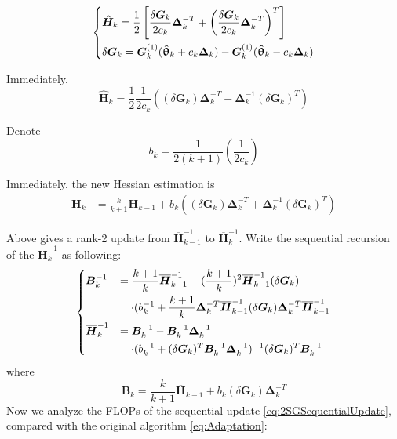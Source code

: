 \documentclass[conference]{IEEEtran}
\newcommand{\bG}{\bm{G}}
\newcommand{\bDelta}{\bm{\Delta}}
\newcommand{\oH}{\bm{\overline{H}}}
\newcommand{\hH}{\bm{\hat{H}}}
\newcommand{\htheta}{\bm{\hat{\uptheta}}}
\begin{document}
\begin{equation} \label{eq:notationSG}
\begin{dcases}
\hH_k=\frac{1}{2}\left[ \frac{\delta\bG_k}{2c_k}\bDelta_k^{-T}+\left(\frac{\delta\bG_k}{2c_k}\bDelta_k^{-T}\right)^T \right]\\
\delta\bG_k=\bG_k^{(1)}(\htheta_k+ c_k\bDelta_k)-\bG_k^{(1)}(\htheta_k- c_k\bDelta_k)\\
\end{dcases}
\end{equation}

Immediately,
\begin{equation} \label{eq:HHatSG}
\hH_k=\frac{1}{2}\frac{1}{2c_k}\left( (\delta\bG_k)\bDelta_k^{-T}+\bDelta_k^{-1}(\delta\bG_k)^{T} \right)
\end{equation}

Denote
\begin{equation}
b_k=\frac{1}{2(k+1)}(\frac{1}{2c_k})
\end{equation}

Immediately, the new Hessian estimation is
\begin{align*}
\oH_k
&=\frac{k}{k+1}\oH_{k-1}+b_k((\delta\bG_k)\bDelta_k^{-T}+\bDelta_k^{-1}(\delta\bG_k)^{T})
\end{align*}

Above gives a rank-2 update from $ \oH_{k-1}^{-1} $ to $ \oH_{k}^{-1} $. Write the sequential recursion of the $ \oH_k^{-1} $ as following:
\begin{equation} \label{eq:2SGSequentialUpdate}
\begin{dcases}
\bm{B}_k^{-1}
&=\frac{k+1}{k}\oH_{k-1}^{-1}-(\frac{k+1}{k})^2\oH_{k-1}^{-1}(\delta\bG_k)\\
&~~~\cdot(b_k^{-1}+\frac{k+1}{k}\bDelta_k^{-T}\oH_{k-1}^{-1}(\delta\bG_k)\bDelta_k^{-T}\oH_{k-1}^{-1}\\
\oH_k^{-1}
&=\bm{B}_k^{-1}-\bm{B}_k^{-1}\bDelta_k^{-1}\\
&~~~\cdot(b_k^{-1}+(\delta\bG_k)^{T}\bm{B}_k^{-1}\bDelta_k^{-1})^{-1}(\delta\bG_k)^{T}\bm{B}_k^{-1}
\end{dcases}
\end{equation}
where
\begin{equation}\label{eq:2SGB}
\bm{B}_k=\frac{k}{k+1}\oH_{k-1}+b_k(\delta\bG_k)\bDelta_k^{-T}
\end{equation}
Now we analyze the FLOPs of the sequential update \ref{eq:2SGSequentialUpdate}, compared with the original algorithm \ref{eq:Adaptation}:
\end{document}
